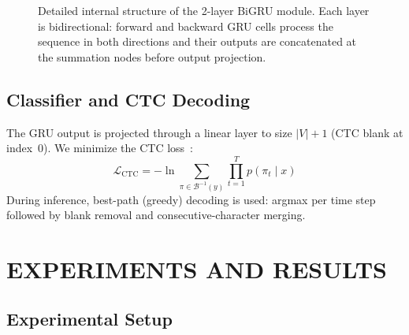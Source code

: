 \documentclass[conference]{IEEEtran}
\begin{document}
\begin{figure}[htbp]
{%
}
\caption{Detailed internal structure of the 2-layer BiGRU module. Each layer is bidirectional: forward and backward GRU cells process the sequence in both directions and their outputs are concatenated at the summation nodes before output projection.}
\label{fig:bigru}
\end{figure}

\subsection{Classifier and CTC Decoding}

The GRU output is projected through a linear layer to size $|V| + 1$ (CTC blank
at index~0). We minimize the CTC loss~\cite{graves2006}:
\begin{equation}
\mathcal{L}_{\text{CTC}} = -\ln \sum_{\pi \in \mathcal{B}^{-1}(y)}
\prod_{t=1}^{T} p(\pi_t \mid x)
\end{equation}
During inference, best-path (greedy) decoding is used: argmax per time step
followed by blank removal and consecutive-character merging.

\section{EXPERIMENTS AND RESULTS}

\subsection{Experimental Setup}
\end{document}
